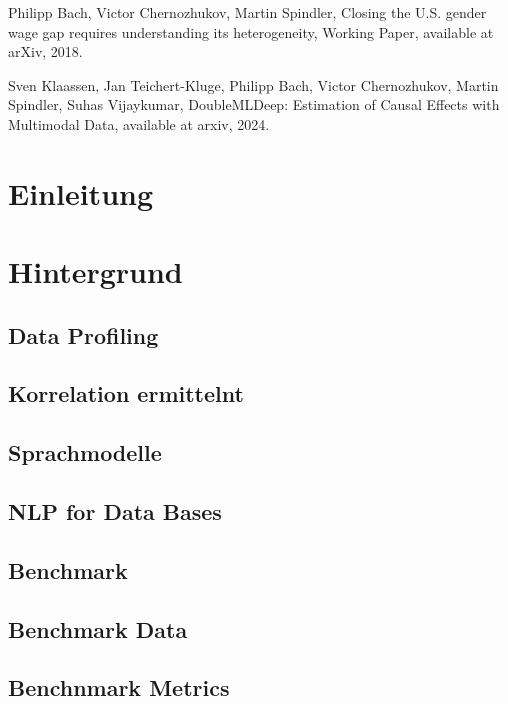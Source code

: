 \documentclass[
  11pt,
  authoryear,
  preprint]{elsarticle}
\begin{document}
Philipp Bach, Victor Chernozhukov, Martin Spindler, Closing the U.S.
gender wage gap requires understanding its heterogeneity, Working Paper,
available at arXiv, 2018.

Sven Klaassen, Jan Teichert-Kluge, Philipp Bach, Victor Chernozhukov,
Martin Spindler, Suhas Vijaykumar, DoubleMLDeep: Estimation of Causal
Effects with Multimodal Data, available at arxiv, 2024.

\citep{RN5574}

\section{Einleitung}\label{einleitung}

\section{Hintergrund}\label{hintergrund}

\subsection{Data Profiling}\label{data-profiling}

\subsection{Korrelation ermittelnt}\label{korrelation-ermittelnt}

\subsection{Sprachmodelle}\label{sprachmodelle}

\subsection{NLP for Data Bases}\label{nlp-for-data-bases}

\subsection{Benchmark}\label{benchmark}

\subsection{Benchmark Data}\label{benchmark-data}

\subsection{Benchnmark Metrics}\label{benchnmark-metrics}
\end{document}
